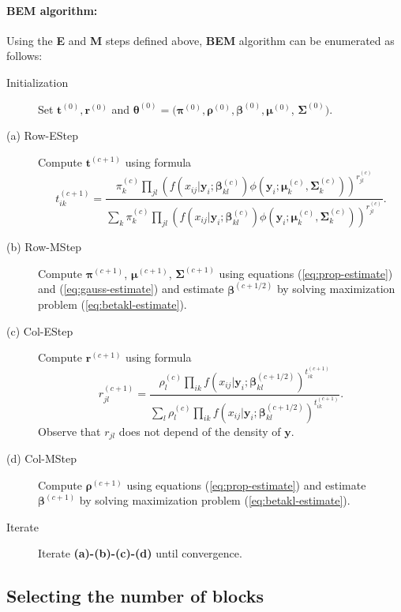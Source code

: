 \documentclass[a4paper]{article}
\newcommand{\br}{\mathbf{r}}
\newcommand{\bt}{\mathbf{t}}
\newcommand{\by}{\mathbf{y}}
\newcommand{\bbeta}{\boldsymbol{\beta}}
\newcommand{\bmu}{\boldsymbol{\mu}}
\newcommand{\bpi}{\boldsymbol{\pi}}
\newcommand{\brho}{\boldsymbol{\rho}}
\newcommand{\bSigma}{\boldsymbol{\Sigma}}
\newcommand{\btheta}{\boldsymbol{\theta}}
\begin{document}
\paragraph{BEM algorithm:} Using the {\bf E} and {\bf M} steps defined above, {\bf BEM} algorithm can be enumerated as follows:
\begin{description}
\item[Initialization] Set $\bt^{(0)},\br^{(0)}$ and $\btheta^{(0)}=(\bpi^{(0)},\brho^{(0)},\bbeta^{(0)},\bmu^{(0)}$, $\bSigma^{(0)}).$
\item[(a) Row-EStep] Compute $\bt^{(c+1)}$ using formula
\begin{equation}\label{eq:RowEStep}
t_{ik}^{(c+1)} = \displaystyle\frac{\pi_k^{(c)} \displaystyle\prod_{jl} \left(f(x_{ij}|\by_i;\bbeta_{kl}^{(c)})\phi(\by_i;\bmu_{k}^{(c)},\bSigma_{k}^{(c)})\right)^{r_{jl}^{(c)}} }
              {\sum_k \pi_k^{(c)} \displaystyle\prod_{jl}\left(f(x_{ij}|\by_i;\bbeta_{kl}^{(c)})\phi(\by_i;\bmu_{k}^{(c)},\bSigma_{k}^{(c)})\right)^{r_{jl}^{(c)}}}.
\end{equation}
\item[(b) Row-MStep] Compute $\bpi^{(c+1)}$, $\bmu^{(c+1)}$,  $\bSigma^{(c+1)}$ using equations (\ref{eq:prop-estimate}) and (\ref{eq:gauss-estimate}) and estimate
$\bbeta^{(c+1/2)}$ by solving maximization problem (\ref{eq:betakl-estimate}).
\item[(c) Col-EStep] Compute $\br^{(c+1)}$ using formula
\begin{equation}\label{eq:ColEStep}
r_{jl}^{(c+1)} = \frac{\rho_l^{(c)} \displaystyle\prod_{ik} f(x_{ij}|\by_i;\bbeta_{kl}^{(c+1/2)} )^{t_{ik}^{(c+1)}} }
              {\sum_l \rho_l^{(c)} \displaystyle\prod_{ik} f(x_{ij}|\by_i;\bbeta_{kl}^{(c+1/2)})^{t_{ik}^{(c+1)}}}.
\end{equation}
Observe that $r_{jl}$ does not depend of the density of $\by$.
\item[(d) Col-MStep] Compute $\brho^{(c+1)}$ using equations (\ref{eq:prop-estimate}) and estimate $\bbeta^{(c+1)}$ by solving maximization problem (\ref{eq:betakl-estimate}). 
\item[Iterate] Iterate {\bf (a)-(b)-(c)-(d)} until convergence.
\end{description}

\subsection{Selecting the number of blocks}
\end{document}
